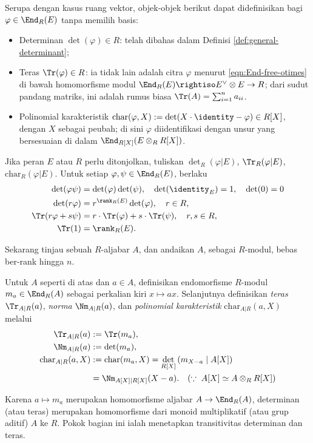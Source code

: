Serupa dengan kasus ruang vektor, objek-objek berikut dapat didefinisikan bagi $\varphi \in \End_R(E)$ tanpa memilih basis:
\begin{itemize}
	\item Determinan $\det(\varphi) \in R$: telah dibahas dalam Definisi \ref{def:general-determinant};
	\item Teras $\Tr(\varphi) \in R$: ia tidak lain adalah citra $\varphi$ menurut \eqref{eqn:End-free-otimes} di bawah homomorfisme modul $\End_R(E) \rightiso E^\vee \otimes E \to R$; dari sudut pandang matriks, ini adalah rumus biasa $\Tr(A) = \sum_{i=1}^n a_{ii}$. 
	\item Polinomial karakteristik $\mathrm{char}(\varphi, X) := \det(X \cdot \identity - \varphi) \in R[X]$, dengan $X$ sebagai peubah; di sini $\varphi$ diidentifikasi dengan unsur yang bersesuaian di dalam $\End_{R[X]}(E \otimes_R R[X])$.
\end{itemize}
Jika peran $E$ atau $R$ perlu ditonjolkan, tuliskan $\det_R(\varphi|E)$, $\Tr_R(\varphi|E)$, $\mathrm{char}_R(\varphi|E)$. Untuk setiap $\varphi, \psi \in \End_R(E)$, berlaku
\begin{align*}
	\det(\varphi\psi) & = \det(\varphi)\det(\psi), \quad \det(\identity_E)=1, \quad \det(0)=0 \\
	\det(r\varphi) &= r^{\rank_R(E)} \det(\varphi), \quad r \in R, \\
	\Tr(r\varphi + s\psi) & = r\cdot\Tr(\varphi) + s\cdot\Tr(\psi), \quad r,s \in R, \\
	\Tr(1) & = \rank_R(E). 
\end{align*}

Sekarang tinjau sebuah $R$-aljabar $A$, dan andaikan $A$, sebagai $R$-modul, bebas ber-rank hingga $n$.
\begin{definition}\label{def:norm-trace}  
	Untuk $A$ seperti di atas dan $a \in A$, definisikan endomorfisme $R$-modul $m_a \in \End_R(A)$ sebagai perkalian kiri $x \mapsto ax$. Selanjutnya definisikan \emph{teras} $\Tr_{A|R}(a)$, \emph{norma} $\Nm_{A|R}(a)$, dan \emph{polinomial karakteristik} $\mathrm{char}_{A|R}(a, X)$ melalui
	\begin{align*}
		\Tr_{A|R}(a) & := \Tr(m_a), \\
		\Nm_{A|R}(a) & := \det(m_a), \\
		\mathrm{char}_{A|R}(a, X) & := \mathrm{char}(m_a, X) = \det_{R[X]}\left( m_{X-a} \mid A[X] \right) \\
		& = \Nm_{A[X]|R[X]}(X-a). \quad (\because\; A[X] \simeq A \otimes_R R[X])
\end{align*}
\end{definition}
Karena $a \mapsto m_a$ merupakan homomorfisme aljabar $A \to \End_R(A)$, determinan (atau teras) merupakan homomorfisme dari monoid multiplikatif (atau grup aditif) $A$ ke $R$. Pokok bagian ini ialah menetapkan transitivitas determinan dan teras.

